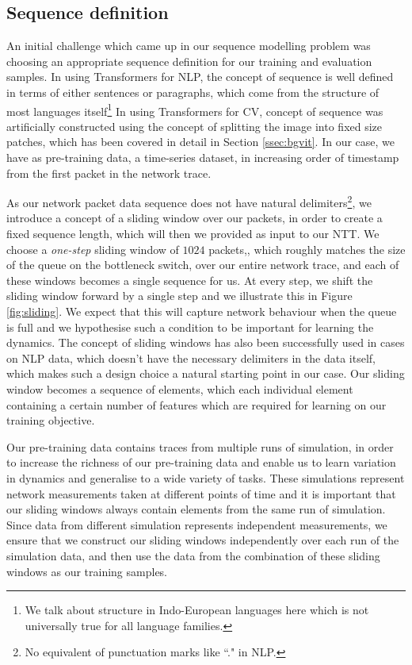 \subsection{Sequence definition}
\label{ssec:desseq}
An initial challenge which came up in our sequence modelling problem was choosing an appropriate sequence definition for our training and evaluation samples. In using Transformers for NLP, the concept of sequence is well defined in terms of either sentences or paragraphs, which come from the structure of most languages itself\footnote{We talk about structure in Indo-European languages here which is not universally true for all language families.} In using Transformers for CV, concept of sequence was artificially constructed using the concept of splitting the image into fixed size patches, which has been covered in detail in Section \ref{ssec:bgvit}. In our case, we have as pre-training data, a time-series dataset, in increasing order of timestamp from the first packet in the network trace.

As our network packet data sequence does not have natural delimiters\footnote{No equivalent of punctuation marks like ``." in NLP.}, we introduce a concept of a sliding window over our packets, in order to create a fixed sequence length, which will then we provided as input to our NTT. We choose a \emph{one-step} sliding window of $1024$ packets,, which roughly matches the size of the queue on the bottleneck switch, over our entire network trace, and each of these windows becomes a single sequence for us. At every step, we shift the sliding window forward by a single step and we illustrate this in Figure \ref{fig:sliding}. We expect that this will capture network behaviour when the queue is full and we hypothesise such a condition to be important for learning the dynamics. The concept of sliding windows has also been successfully used in cases on NLP data, which doesn't have the necessary delimiters in the data itself\cite{beltagyLongformerLongDocumentTransformer2020}, which makes such a design choice a natural starting point in our case. Our sliding window becomes a sequence of elements, which each individual element containing a certain number of features which are required for learning on our training objective.

Our pre-training data contains traces from multiple runs of simulation, in order to increase the richness of our pre-training data and enable us to learn variation in dynamics and generalise to a wide variety of tasks. These simulations represent network measurements taken at different points of time and it is important that our sliding windows always contain elements from the same run of simulation. Since data from different simulation represents independent measurements, we ensure that we construct our sliding windows independently over each run of the simulation data, and then use the data from the combination of these sliding windows as our training samples.

